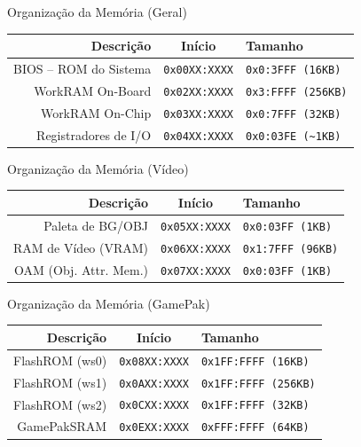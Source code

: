 \documentclass{beamer}
\begin{document}
\begin{darkframes}
\begin{frame}{Organização da Memória (Geral)}
    \begin{center}
        \begin{tabular}{|r|c|l|}
            \hline
            Descrição              & Início               & Tamanho \\\hline
            BIOS -- ROM do Sistema & \texttt{0x00XX:XXXX} & \texttt{0x0:3FFF (16KB)} \\\hline
            WorkRAM On-Board       & \texttt{0x02XX:XXXX} & \texttt{0x3:FFFF (256KB)} \\\hline
            WorkRAM On-Chip        & \texttt{0x03XX:XXXX} & \texttt{0x0:7FFF (32KB)} \\\hline
            Registradores de I/O   & \texttt{0x04XX:XXXX} & \texttt{0x0:03FE (\textasciitilde1KB)} \\\hline
        \end{tabular}
    \end{center}
\end{frame}

\begin{frame}{Organização da Memória (Vídeo)}
    \begin{center}
        \begin{tabular}{|r|c|l|}
            \hline
            Descrição             & Início               & Tamanho \\\hline
            Paleta de BG/OBJ      & \texttt{0x05XX:XXXX} & \texttt{0x0:03FF (1KB)} \\\hline
            RAM de Vídeo (VRAM)   & \texttt{0x06XX:XXXX} & \texttt{0x1:7FFF (96KB)} \\\hline
            OAM (Obj. Attr. Mem.) & \texttt{0x07XX:XXXX} & \texttt{0x0:03FF (1KB)} \\\hline
        \end{tabular}
    \end{center}
\end{frame}

\begin{frame}{Organização da Memória (GamePak)}
    \begin{center}
        \begin{tabular}{|r|c|l|}
            \hline
            Descrição      & Início               & Tamanho \\\hline
            FlashROM (ws0) & \texttt{0x08XX:XXXX} & \texttt{0x1FF:FFFF (16KB)} \\\hline
            FlashROM (ws1) & \texttt{0x0AXX:XXXX} & \texttt{0x1FF:FFFF (256KB)} \\\hline
            FlashROM (ws2) & \texttt{0x0CXX:XXXX} & \texttt{0x1FF:FFFF (32KB)} \\\hline
            GamePakSRAM    & \texttt{0x0EXX:XXXX} & \texttt{0xFFF:FFFF (64KB)} \\\hline
        \end{tabular}
    \end{center}
\end{frame}


\end{darkframes}
\end{document}
